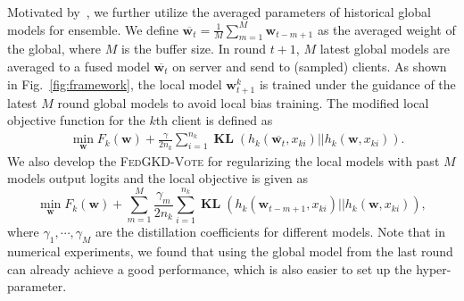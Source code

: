 \documentclass{article} %
\newcommand{\LS}{\mathcal{L}}
\newcommand{\w}{\boldsymbol{w}}
\DeclareMathOperator{\E}{\mathbb{E}}
\DeclareMathOperator{\KL}{\boldsymbol{\mathbf{KL}}}
\newcommand{\systemled}{\textsc{FedGKD-Vote}\xspace}
\begin{document}
Motivated by~\citep{xu2020improving}, we further utilize the averaged parameters of historical global models for ensemble.
We define $\overline{\w_t} = \frac{1}{M}\sum_{m=1}^{M} \w_{t-m+1}$ as the averaged weight of the global, where $M$ is the buffer size. In round $t+1$, $M$ latest global models are averaged to a fused model $\overline{\w_t}$ on server and send to (sampled) clients. As shown in Fig.~\ref{fig:framework}, the local model $\w^k_{t+1}$ is trained under the guidance of the latest $M$ round global models to avoid local bias training. 
The modified local objective function for the $k$th client is defined as 
\begin{align}
  &\min_{\w} {F_k(\w) + \frac{\gamma}{2n_k}\sum_{i=1}^{n_k} \KL(h_k(\overline{\w_t},x_{ki}) || h_k(\w,x_{ki}))}.\label{eq:obj_avg}
\end{align}
We also develop the \systemled for regularizing the local models with past $M$ models output logits and the local objective is given as
\begin{equation}
  \min_{\w} {F_k(\w)\!+\!\sum_{m=1}^{M}\!\frac{\gamma_m}{2n_k}\!\sum_{i=1}^{n_k}\KL(h_k(\w_{t\!-\!m\!+\!1}\!,x_{ki}) || h_k(\w\!,x_{ki}))} , \label{eq:obj_his}
\end{equation}
where $\gamma_1,\cdots, \gamma_M$ are the distillation coefficients for different models.
Note that in numerical experiments, we found that using the global model from the last round  can already achieve a good performance, which is also easier to set up the hyper-parameter. 
\end{document}
